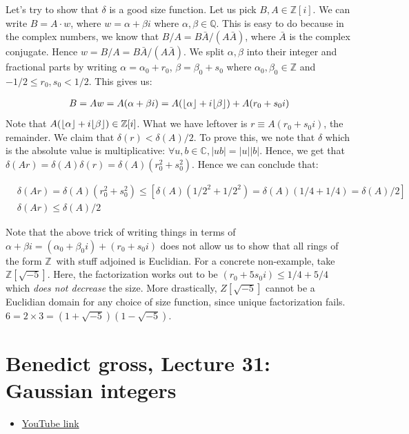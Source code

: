 \documentclass{book}
\newcommand{\Z}{\ensuremath{\mathbb{Z}}}
\newcommand{\Q}{\ensuremath{\mathbb{Q}}}
\newcommand{\C}{\ensuremath{\mathbb{C}}}
\DeclarePairedDelimiter\floor{\lfloor}{\rfloor}
\theoremstyle{definition}
\begin{document}
Let's try to show that $\delta$ is a good size function. Let us pick $B, A \in \Z[i]$.
We can write $B = A \cdot w$, where $w = \alpha + \beta i$ where $\alpha, \beta \in \Q$.
This is easy to do because in the complex numbers, we know that $B/A = B\bar{A}/(A\bar{A})$,
where $\bar A$ is the complex conjugate.  Hence $w = B/A = B\bar{A}/(A\bar{A})$.
We split $\alpha, \beta$ into their integer and fractional parts by
writing $\alpha = \alpha_0 + r_0$, $\beta = \beta_0 + s_0$ where
$\alpha_0, \beta_0 \in \Z$ and $-1/2 \leq r_0, s_0 < 1/2$. This gives us:

\begin{align*}
B = Aw = A(\alpha + \beta i) = A(\floor{\alpha} + i \floor \beta) + A(r_0 + s_0 i) \\
\end{align*}
Note that $A(\floor{\alpha} + i \floor \beta) \in \Z[i]$. What
we have leftover is $r \equiv A(r_0 + s_0 i)$, the remainder. 
We claim that $\delta(r) < \delta(A)/2$. To prove this, we note that $\delta$
which is the absolute value is multiplicative: $\forall u, b \in \C, |ub| = |u||b|$.
Hence, we get that $\delta(Ar) = \delta(A)\delta(r) = \delta(A)(r_0^2 + s_0^2)$.
Hence we can conclude that:

\begin{align*}
& \delta(Ar) = \delta(A)(r_0^2 + s_0^2) \leq \left[ \delta(A)(1/2^2 + 1/2^2) = \delta(A)(1/4 + 1/4) = \delta(A)/2 \right] \\
& \delta(Ar) \leq \delta(A)/2
\end{align*}

Note that the above trick of writing things in terms of $\alpha + \beta i = (\alpha_0 + \beta_0 i) + (r_0 + s_0i)$
does not allow us to show that all rings of the form \Z~with stuff adjoined is Euclidian. For
a concrete non-example, take $\Z[\sqrt{-5}]$. Here, the factorization works
out to be $(r_0 + 5 s_0 i) \leq 1/4 + 5/4$ which \emph{does not decrease} the
size. More drastically, $Z[\sqrt{-5}]$ cannot be a Euclidian domain for any
choice of size function, since unique factorization fails. $6 = 2 \times 3 = (1+ \sqrt{-5})(1-\sqrt{-5})$.

\chapter{Benedict gross, Lecture 31: Gaussian integers}
\begin{itemize}
    \item \href{https://www.youtube.com/watch?v=l1OWAasmBLI&list=PLelIK3uylPMGzHBuR3hLMHrYfMqWWsmx5&index=31}{YouTube link}
\end{itemize}
\end{document}
